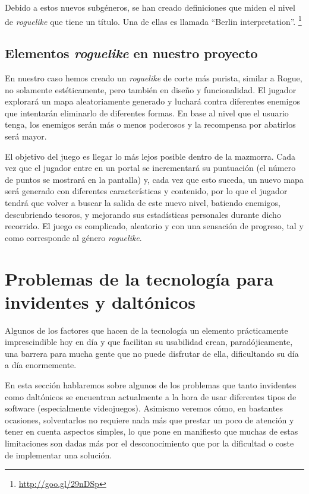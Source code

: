 Debido a estos nuevos subgéneros, se han creado definiciones que miden el nivel de \textit{roguelike} que tiene un título. Una de ellas es llamada ``Berlin interpretation''. \footnote{\url{http://goo.gl/29nDSp}}

\subsection{Elementos \textit{roguelike} en nuestro proyecto}

En nuestro caso hemos creado un \textit{roguelike} de corte más purista, similar a Rogue, no solamente estéticamente, pero también en diseño y funcionalidad. El jugador explorará un mapa aleatoriamente generado y luchará contra diferentes enemigos que intentarán eliminarlo de diferentes formas. En base al nivel que el usuario tenga, los enemigos serán más o menos poderosos y la recompensa por abatirlos será mayor.

El objetivo del juego es llegar lo más lejos posible dentro de la mazmorra. Cada vez que el jugador entre en un portal se incrementará su puntuación (el número de puntos se mostrará en la pantalla) y, cada vez que esto suceda, un nuevo mapa será generado con diferentes características y contenido, por lo que el jugador tendrá que volver a buscar la salida de este nuevo nivel, batiendo enemigos, descubriendo tesoros, y mejorando sus estadísticas personales durante dicho recorrido. El juego es complicado, aleatorio y con una sensación de progreso, tal y como corresponde al género \textit{roguelike}.


\section{Problemas de la tecnología para invidentes y daltónicos}
\label{sec:dificultadesfeedback}

Algunos de los factores que hacen de la tecnología un elemento prácticamente imprescindible hoy en día y que facilitan su usabilidad crean, paradójicamente, una barrera para mucha gente que no puede disfrutar de ella, dificultando su día a día enormemente.

En esta sección hablaremos sobre algunos de los problemas que tanto invidentes como daltónicos se encuentran actualmente a la hora de usar diferentes tipos de software (especialmente videojuegos). Asimismo veremos cómo, en bastantes ocasiones, solventarlos no requiere nada más que prestar un poco de atención y tener en cuenta aspectos simples, lo que pone en manifiesto que muchas de estas limitaciones son dadas más por el desconocimiento que por la dificultad o coste de implementar una solución.

